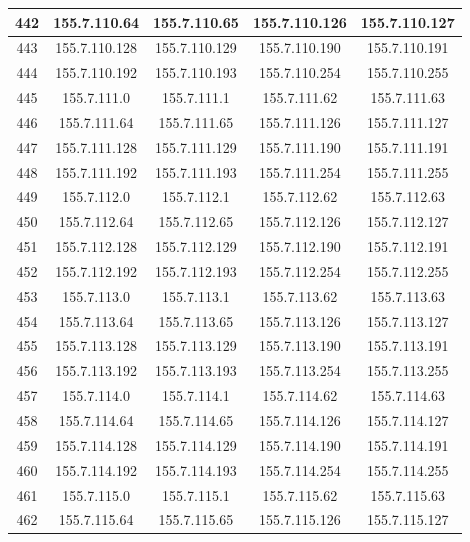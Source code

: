 \documentclass[letterpaper,12pt]{article}
\begin{document}
\begin{longtable}{|c|c|c|c|c|}
        442 & 155.7.110.64 & 155.7.110.65 & 155.7.110.126 & 155.7.110.127 \\ \hline
        443 & 155.7.110.128 & 155.7.110.129 & 155.7.110.190 & 155.7.110.191 \\ \hline
        444 & 155.7.110.192 & 155.7.110.193 & 155.7.110.254 & 155.7.110.255 \\ \hline
        445 & 155.7.111.0 & 155.7.111.1 & 155.7.111.62 & 155.7.111.63 \\ \hline
        446 & 155.7.111.64 & 155.7.111.65 & 155.7.111.126 & 155.7.111.127 \\ \hline
        447 & 155.7.111.128 & 155.7.111.129 & 155.7.111.190 & 155.7.111.191 \\ \hline
        448 & 155.7.111.192 & 155.7.111.193 & 155.7.111.254 & 155.7.111.255 \\ \hline
        449 & 155.7.112.0 & 155.7.112.1 & 155.7.112.62 & 155.7.112.63 \\ \hline
        450 & 155.7.112.64 & 155.7.112.65 & 155.7.112.126 & 155.7.112.127 \\ \hline
        451 & 155.7.112.128 & 155.7.112.129 & 155.7.112.190 & 155.7.112.191 \\ \hline
        452 & 155.7.112.192 & 155.7.112.193 & 155.7.112.254 & 155.7.112.255 \\ \hline
        453 & 155.7.113.0 & 155.7.113.1 & 155.7.113.62 & 155.7.113.63 \\ \hline
        454 & 155.7.113.64 & 155.7.113.65 & 155.7.113.126 & 155.7.113.127 \\ \hline
        455 & 155.7.113.128 & 155.7.113.129 & 155.7.113.190 & 155.7.113.191 \\ \hline
        456 & 155.7.113.192 & 155.7.113.193 & 155.7.113.254 & 155.7.113.255 \\ \hline
        457 & 155.7.114.0 & 155.7.114.1 & 155.7.114.62 & 155.7.114.63 \\ \hline
        458 & 155.7.114.64 & 155.7.114.65 & 155.7.114.126 & 155.7.114.127 \\ \hline
        459 & 155.7.114.128 & 155.7.114.129 & 155.7.114.190 & 155.7.114.191 \\ \hline
        460 & 155.7.114.192 & 155.7.114.193 & 155.7.114.254 & 155.7.114.255 \\ \hline
        461 & 155.7.115.0 & 155.7.115.1 & 155.7.115.62 & 155.7.115.63 \\ \hline
        462 & 155.7.115.64 & 155.7.115.65 & 155.7.115.126 & 155.7.115.127 \\ \hline

\end{longtable}
\end{document}
